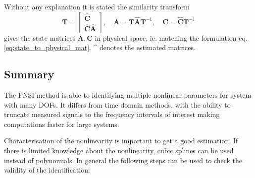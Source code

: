 Without any explanation it is stated the similarity transform
\begin{equation}
  \bm T =
  \begin{bmatrix}
    \hat{\bm C} \\
    \hat{\bm C} \hat{\bm A}
  \end{bmatrix}
  , \quad
  \bm A = \bm T \hat{\bm A} \bm T^{-1}, \quad
  \bm C = \hat{\bm C} \bm T^{-1}
\end{equation}
gives the state matrices $\bm A, \bm C$ in physical space, ie. matching the
formulation eq. \eqref{eq:state_to_physical_mat}. \^{} denotes the estimated
matrices.





\subsection{Summary}
\label{sec:summary-fnsi}

The FNSI method is able to identifying multiple nonlinear parameters for system
with many DOFs. It differs from time domain methods, with the ability to
truncate measured signals to the frequency intervals of interest making
computations faster for large systems.

Characterisation of the nonlinearity is important to get a good estimation.
If there is limited knowledge about the nonlinearity, cubic splines can be used
instead of polynomials.
In general the following steps can be used to check the validity of the
identification:

